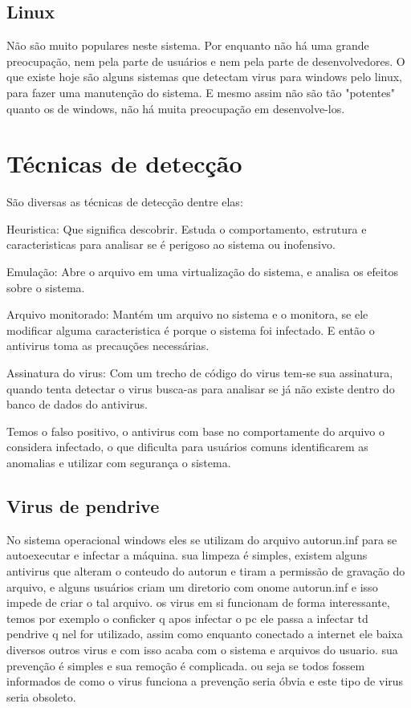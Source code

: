 \subsection{Linux}
Não são muito populares neste sistema. Por enquanto não há uma grande preocupação, nem pela parte de usuários e nem pela parte de desenvolvedores. O que existe hoje são alguns sistemas que detectam virus para windows pelo linux, para fazer uma manutenção do sistema. E mesmo assim não são tão "potentes" quanto os de windows, não há muita preocupação em desenvolve-los.


\section{Técnicas de detecção}
	São diversas as técnicas de detecção dentre elas:
	
	
	Heuristica: Que significa descobrir. Estuda o comportamento, estrutura e caracteristicas para analisar se é perigoso ao sistema ou inofensivo.
	
	
	Emulação: Abre o arquivo em uma virtualização do sistema, e analisa os efeitos sobre o sistema.
	
	
	Arquivo monitorado: Mantém um arquivo no sistema e o monitora, se ele modificar alguma caracteristica é porque o sistema foi infectado. E então o antivirus toma as precauções necessárias.
	
	
	Assinatura do virus: Com um trecho de código do virus tem-se sua assinatura, quando tenta detectar o virus busca-as para analisar se já não existe dentro do banco de dados do antivirus.
	
	
	Temos o falso positivo, o antivirus com base no comportamente do arquivo o considera infectado, o que dificulta para usuários comuns identificarem as anomalias e utilizar com segurança o sistema.

\subsection{Virus de pendrive}
No sistema operacional windows eles se utilizam do arquivo autorun.inf para se autoexecutar e infectar a máquina. sua limpeza é simples, existem alguns antivirus que alteram o conteudo do autorun e tiram a permissão de gravação do arquivo, e alguns usuários criam um diretorio com onome autorun.inf e isso impede de criar o tal arquivo. os virus em si funcionam de forma interessante, temos por exemplo o conficker q apos infectar o pc ele passa a infectar td pendrive q nel for utilizado, assim como enquanto conectado a internet ele baixa diversos outros virus e com isso acaba com o sistema e arquivos do usuario. sua prevenção é simples e sua remoção é complicada. ou seja se todos fossem informados de como o virus funciona a prevenção seria óbvia e este tipo de virus seria obsoleto.

